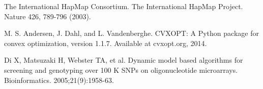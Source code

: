 \documentclass{scrartcl}
\begin{document}
\begin{thebibliography}{9}
The International HapMap Consortium. The International HapMap Project.
Nature 426, 789-796 (2003).

M. S. Andersen, J. Dahl, and L. Vandenberghe. CVXOPT: A Python package for
convex optimization, version 1.1.7.  Available at cvxopt.org, 2014.

Di X, Matsuzaki H, Webster TA, et al. Dynamic model based algorithms for
screening and genotyping over 100 K SNPs on oligonucleotide microarrays.
Bioinformatics. 2005;21(9):1958-63.

\end{thebibliography}
\end{document}
